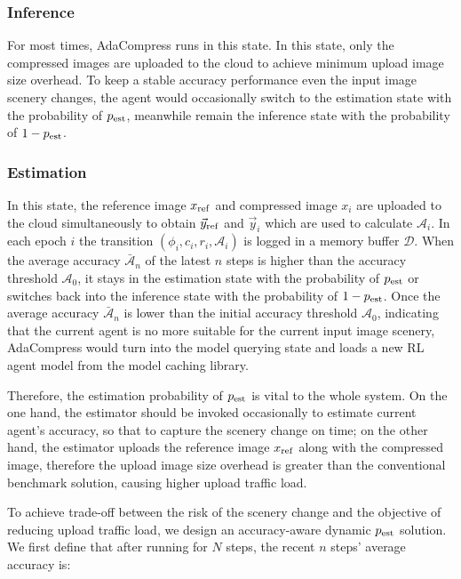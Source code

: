 \subsubsection{\textbf{Inference}}

For most times, AdaCompress runs in this state. In this state, only the compressed images are uploaded to the cloud to achieve minimum upload image size overhead. To keep a stable accuracy performance even the input image scenery changes, the agent would occasionally switch to the estimation state with the probability of $ p_{\rm est} $, meanwhile remain the inference state with the probability of $ 1 - p_{\rm est} $. %

\subsubsection{\textbf{Estimation}}

In this state, the reference image $ x_{\rm ref} $ and compressed image $ x_i $ are uploaded to the cloud simultaneously to obtain $ \vec{y}_{\rm ref} $ and $ \vec{y}_i $ which are used to calculate $ \mathcal{A}_i $. In each epoch $ i $ the transition $ (\phi_i, c_i, r_i, \mathcal{A}_i) $ is logged in a memory buffer $ \mathcal{D} $. When the average accuracy $ \bar{\mathcal{A}}_n $ of the latest $ n $ steps is higher than the accuracy threshold $ \mathcal{A}_0 $, it stays in the estimation state with the probability of $ p_{\rm est} $ or switches back into the inference state with the probability of $ 1 - p_{\rm est} $. Once the average accuracy $ \bar{\mathcal{A}}_n $ is lower than the initial accuracy threshold $ \mathcal{A}_0 $, indicating that the current agent is no more suitable for the current input image scenery, AdaCompress would turn into the model querying state and loads a new RL agent model from the model caching library. %

Therefore, the estimation probability of $ p_{\rm est} $ is vital to the whole system. On the one hand, the estimator should be invoked occasionally to estimate current agent's accuracy, so that to capture the scenery change on time; on the other hand, the estimator uploads the reference image $ x_{\rm ref} $ along with the compressed image, therefore the upload image size overhead is greater than the conventional benchmark solution, causing higher upload traffic load. %

To achieve trade-off between the risk of the scenery change and the objective of reducing upload traffic load, we design an accuracy-aware dynamic $ p_{\rm est} $ solution. We first define that after running for $ N $ steps, the recent $ n $ steps' average accuracy is: 

